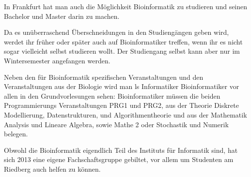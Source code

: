 In Frankfurt hat man auch die M\"oglichkeit Bioinformatik zu studieren und seinen Bachelor und Master darin zu machen.

Da es un\"uberraschend \"Uberschneidungen in den Studieng\"angen geben wird, werdet ihr fr\"uher oder sp\"ater auch auf Bioinformatiker treffen, wenn ihr es nicht sogar vielleicht selbst studieren wollt.
Der Studiengang selbst kann aber nur im Wintersemester angefangen werden.

Neben den f\"ur Bioinformatik spezifischen Veranstaltungen und den Veranstaltungen aus der Biologie wird man 
ls Informatiker Bioinformatiker vor allen in den Grundvorlesungen sehen:
Bioinformatiker m\"ussen die beiden Programmierungs Veranstaltungen PRG1 und
PRG2, aus der Theorie Diskrete Modellierung, Datenstrukturen, und
Algorithmentheorie und aus der Mathematik Analysis und Lineare Algebra, sowie
Mathe 2 oder Stochastik und Numerik belegen.

Obwohl die Bioinformatik eigendlich Teil des Instituts f\"ur Informatik sind,
hat sich 2013 eine eigene Fachschaftsgruppe gebiltet, vor allem um Studenten am
Riedberg auch helfen zu k\"onnen.
